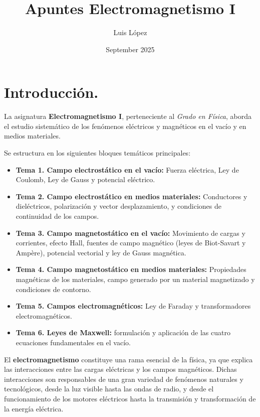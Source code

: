 \documentclass[a4paper,12pt]{article}
\title{Apuntes Electromagnetismo I}
\author{Luis López}
\date{September 2025}
\begin{document}
\maketitle %

\newpage 

\tableofcontents %
\newpage 

\section*{Introducción.}
\noindent
La asignatura \textbf{Electromagnetismo I}, perteneciente al \textit{Grado en Física}, aborda el estudio sistemático de los fenómenos eléctricos y magnéticos en el vacío y en medios materiales.  

\medskip
\noindent
Se estructura en los siguientes bloques temáticos principales:

\begin{itemize}
    \item \textbf{Tema 1. Campo electrostático en el vacío:} Fuerza eléctrica, Ley de Coulomb, Ley de Gauss y potencial eléctrico. 
    \item \textbf{Tema 2. Campo electrostático en medios materiales:} Conductores y dieléctricos, polarización y vector desplazamiento, y condiciones de continuidad de los campos.
    \item \textbf{Tema 3. Campo magnetostático en el vacío:} Movimiento de cargas y corrientes, efecto Hall, fuentes de campo magnético (leyes de Biot-Savart y Ampère), potencial vectorial y ley de Gauss magnética.
    \item \textbf{Tema 4. Campo magnetostático en medios materiales:} Propiedades magnéticas de los materiales, campo generado por un material magnetizado y condiciones de contorno.
    \item \textbf{Tema 5. Campos electromagnéticos:} Ley de Faraday y transformadores electromagnéticos.
    \item \textbf{Tema 6. Leyes de Maxwell:} formulación y aplicación de las cuatro ecuaciones fundamentales en el vacío.
\end{itemize}

\medskip
\noindent
El \textbf{electromagnetismo} constituye una rama esencial de la física, ya que explica las interacciones entre las cargas eléctricas y los campos magnéticos. Dichas interacciones son responsables de una gran variedad de fenómenos naturales y tecnológicos, desde la luz visible hasta las ondas de radio, y desde el funcionamiento de los motores eléctricos hasta la transmisión y transformación de la energía eléctrica.\\ 
\end{document}
